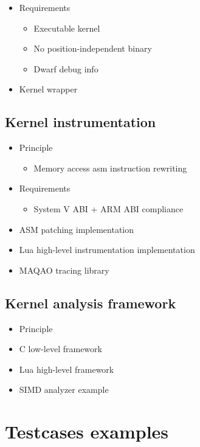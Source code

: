 \documentclass[11pt, a4paper, twoside]{montblanc2}
\begin{document}
\begin{itemize}
  \item Requirements
    \begin{itemize}
      \item Executable kernel
      \item No position-independent binary
      \item Dwarf debug info
    \end{itemize}
  \item Kernel wrapper
\end{itemize}

\subsection{Kernel instrumentation}

\begin{itemize}
  \item Principle
    \begin{itemize}
      \item Memory access asm instruction rewriting
    \end{itemize}
  \item Requirements
    \begin{itemize}
      \item System V ABI + ARM ABI compliance
    \end{itemize}
  \item ASM patching implementation
  \item Lua high-level instrumentation implementation
  \item MAQAO tracing library
\end{itemize}

\subsection{Kernel analysis framework}

\begin{itemize}
  \item Principle
  \item C low-level framework
  \item Lua high-level framework
  \item SIMD analyzer example
\end{itemize}

\section{Testcases examples}
\end{document}
